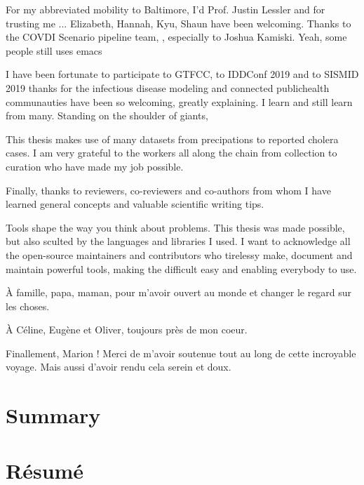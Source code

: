  
 For my abbreviated mobility to Baltimore, I'd Prof. Justin Lessler and for trusting me  ... Elizabeth, Hannah, Kyu, Shaun have been welcoming. Thanks to the COVDI Scenario pipeline team, , especially to Joshua Kamiski. Yeah, some people still uses emacs
 
 I have been fortunate to participate to GTFCC, to IDDConf 2019 and to SISMID 2019 thanks for the infectious disease modeling and connected publichealth communauties have been so welcoming, greatly explaining. I learn and still learn from many. Standing on the shoulder of giants, 
 
 This thesis makes use of many datasets from precipations to reported cholera cases. I am very grateful to the workers all along the chain from collection to curation who have made my job possible.
 
 Finally, thanks to reviewers, co-reviewers and co-authors from whom I have learned general concepts and valuable scientific writing tips.
 
Tools shape the way you think about problems. This thesis was made possible, but also sculted by the languages and libraries I used. I want to acknowledge all the open-source maintainers and contributors who tirelessy make, document and maintain powerful tools, making the difficult easy and enabling everybody to use.

À famille, papa, maman, pour m'avoir ouvert au monde et changer le regard sur les choses.

À Céline, Eugène et Oliver, toujours près de mon coeur. %

Finallement, Marion ! Merci de m'avoir soutenue tout au long de cette incroyable voyage. Mais aussi d'avoir rendu cela serein et doux. 
 
 \chapter{Summary}
 
 \chapter{Résumé}